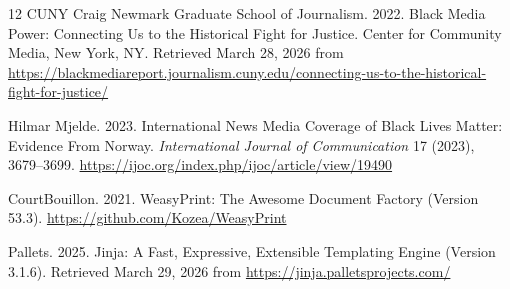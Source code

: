 \documentclass[sigconf,anonymous]{acmart}
\begin{document}
\begin{thebibliography}{12}
CUNY Craig Newmark Graduate School of Journalism. 2022.
Black Media Power: Connecting Us to the Historical Fight for Justice.
Center for Community Media, New York, NY.
Retrieved March 28, 2026 from \url{https://blackmediareport.journalism.cuny.edu/connecting-us-to-the-historical-fight-for-justice/}

Hilmar Mjelde. 2023.
International News Media Coverage of Black Lives Matter: Evidence From Norway.
\textit{International Journal of Communication} 17 (2023), 3679--3699.
\url{https://ijoc.org/index.php/ijoc/article/view/19490}

CourtBouillon. 2021.
WeasyPrint: The Awesome Document Factory (Version 53.3).
\url{https://github.com/Kozea/WeasyPrint}

Pallets. 2025.
Jinja: A Fast, Expressive, Extensible Templating Engine (Version 3.1.6).
Retrieved March 29, 2026 from \url{https://jinja.palletsprojects.com/}

\end{thebibliography}
\end{document}
